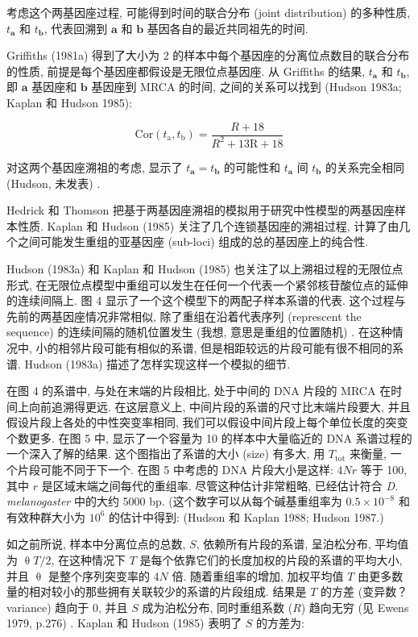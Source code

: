\documentclass[12pt]{article}
\begin{document}
考虑这个两基因座过程, 可能得到时间的联合分布 (joint distribution) 的多种性质, $t_{\mathbf{a}}$ 和
$t_{\mathbf{b}}$, 代表回溯到 $\mathbf{a}$ 和 $\mathbf{b}$ 基因各自的最近共同祖先的时间.

Griffiths (1981a) 得到了大小为 2 的样本中每个基因座的分离位点数目的联合分布的性质,
前提是每个基因座都假设是无限位点基因座. 从 Griffiths 的结果, $t_{\mathbf{a}}$ 和 $t_{\mathbf{b}}$, 即
$\mathbf{a}$ 基因座和 $\mathbf{b}$ 基因座到 MRCA 的时间, 之间的关系可以找到 (Hudson 1983a; Kaplan 和 Hudson
1985):

\begin{equation} \label{eq:13}
    \text{Cor}(t_{\mathrm{a}},t_{\mathrm{b}})=\frac{R+18}{R^{2}+13\mathrm{R}+18}
\end{equation}

对这两个基因座溯祖的考虑, 显示了 $t_{\mathbf{a}}=t_{\mathbf{b}}$ 的可能性和 $t_{\mathbf{a}}$ 间
$t_{\mathbf{b}}$ 的关系完全相同 (Hudson, 未发表) .

Hedrick 和 Thomson 把基于两基因座溯祖的模拟用于研究中性模型的两基因座样本性质. Kaplan 和 Hudson (1985)
关注了几个连锁基因座的溯祖过程, 计算了由几个之间可能发生重组的亚基因座 (sub-loci) 组成的总的基因座上的纯合性.

Hudson (1983a) 和 Kaplan 和 Hudson (1985) 也关注了以上溯祖过程的无限位点形式,
在无限位点模型中重组可以发生在任何一个代表一个紧邻核苷酸位点的延伸的连续间隔上. 图 4
显示了一个这个模型下的两配子样本系谱的代表. 这个过程与先前的两基因座情况非常相似, 除了重组在沿着代表序列 (represcent the
sequence) 的连续间隔的随机位置发生 (我想, 意思是重组的位置随机) . 在这种情况中, 小的相邻片段可能有相似的系谱,
但是相距较远的片段可能有很不相同的系谱. Hudson (1983a) 描述了怎样实现这样一个模拟的细节.

在图 4 的系谱中, 与处在末端的片段相比, 处于中间的 DNA 片段的 MRCA 在时间上向前追溯得更远. 在这层意义上,
中间片段的系谱的尺寸比末端片段要大, 并且假设片段上各处的中性突变率相同, 我们可以假设中间片段上每个单位长度的突变个数更多.
在图 5 中, 显示了一个容量为 10 的样本中大量临近的 DNA 系谱过程的一个深入了解的结果. 这个图指出了系谱的大小 (size)
有多大, 用 $T_{\text{tot}}$ 来衡量, 一个片段可能不同于下一个. 在图 5 中考虑的 DNA 片段大小是这样: $4Nr$ 等于 100, 其中
$r$ 是区域末端之间每代的重组率. 尽管这种估计非常粗略, 已经估计符合 \textit{D. melanogaster} 中的大约 5000 bp.
(这个数字可以从每个碱基重组率为 $0.5\times 10^{-8}$ 和有效种群大小为 $10^{6}$ 的估计中得到:  (Hudson 和 Kaplan
1988; Hudson 1987.)

如之前所说, 样本中分离位点的总数, $S$, 依赖所有片段的系谱, 呈泊松分布, 平均值为 $\uptheta T/2$, 在这种情况下 $T$
是每个依靠它们的长度加权的片段的系谱的平均大小, 并且 $\uptheta$ 是整个序列突变率的 $4N$ 倍. 随着重组率的增加, 加权平均值
$T$ 由更多数量的相对较小的那些拥有关联较少的系谱的片段组成. 结果是 $T$ 的方差 (变异数？ variance) 趋向于 0, 并且 $S$
成为泊松分布, 同时重组系数 ($R$) 趋向无穷 (见 Ewens 1979, p.276) . Kaplan 和 Hudson (1985) 表明了 $S$
的方差为:
\end{document}
